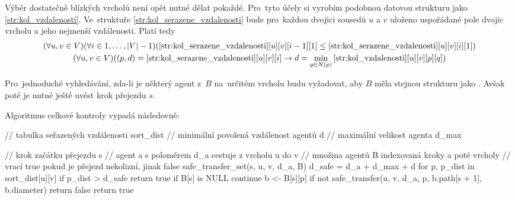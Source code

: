 Výběr dostatečně blízkých vrcholů není opět nutné dělat pokaždé.
Pro~tyto účely si vyrobím podobnou datovou strukturu jako \ref{str:kol_vzdalenosti}.
Ve~struktuře \ref{str:kol_serazene_vzdalenosti}
bude pro~každou dvojici sousedů $u$ a $v$ uloženo uspořádané pole dvojic vrcholu a jeho nejmenší vzdálenosti.
Platí tedy
\begin{gather*}
(\forall u, v \in V)(\forall i \in {1, \dots, |V| - 1})(\ref{str:kol_serazene_vzdalenosti}[u][v][i - 1][1] \leq
\ref{str:kol_serazene_vzdalenosti}[u][v][i][1])
	\\
	(\forall u, v \in V)((p, d) = \ref{str:kol_serazene_vzdalenosti}[u][v][i] \rightarrow
	d = \min_{q \in N(p)}\ref{str:kol_vzdalenosti}[u][v][p][q])
\end{gather*}

Pro~jednoduché vyhledávání, zda-li je některý agent z~$B$ na~určitém vrcholu budu vyžadovat,
aby $B$ měla stejnou strukturu jako .
Avšak poté je nutné ještě uvést krok přejezdu $s$.

Algoritmus celkové kontroly vypadá následovně:
\begin{code}[fontsize=\footnotesize]
// tabulka seřazených vzdálenosti sort_dist
// minimální povolená vzdálenost agentů d
// maximální velikost agenta d_max

// krok začátku přejezdu s
// agent a s poloměrem d_a cestuje z vrcholu u do v
// množina agentů B indexovaná kroky a poté vrcholy
// vrací true pokud je přejezd nekolizní, jinak false
safe_transfer_set(s, u, v, d_a, B)
	d_safe = d_a + d_max + d
	for p, p_dist in sort_dist[u][v]
		if p_dist > d_safe
			return true
		if B[s] is NULL
			continue
		b <- B[s][p]
		if not safe_transfer(u, v, d_a, p, b.path[s + 1], b.diameter)
			return false
	return true
\end{code}
